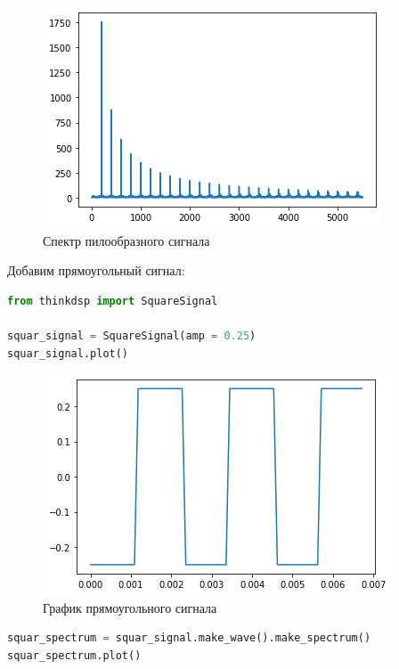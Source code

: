 \begin{figure}[H]
	\begin{center}
		\includegraphics[scale=1]{fig/lab02/lab02_7_0.png}
		\caption{Спектр пилообразного сигнала}
	\end{center}
\end{figure}

Добавим прямоугольный сигнал:

\begin{lstlisting}[language=Python]
from thinkdsp import SquareSignal

squar_signal = SquareSignal(amp = 0.25)
squar_signal.plot()
\end{lstlisting}

\begin{figure}[H]
	\begin{center}
		\includegraphics[scale=1]{fig/lab02/lab02_9_0.png}
		\caption{График прямоугольного сигнала}
	\end{center}
\end{figure}

\begin{lstlisting}[language=Python]
squar_spectrum = squar_signal.make_wave().make_spectrum()
squar_spectrum.plot()
\end{lstlisting}

